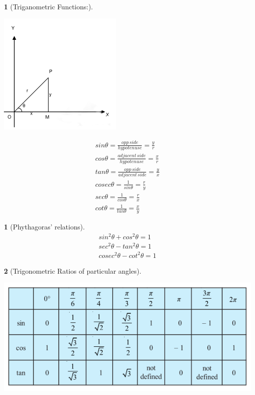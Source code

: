 \documentclass[12pt]{article}
\theoremstyle{colored}
\newtheorem*{defn}{}
\theoremstyle{subcolored}
\newtheorem*{subdefn}{}
\begin{document}
\begin{multicols}{2}
\begin{defn}[Triganometric Functions:]
\end{defn}

\begin{center}
  \includegraphics[scale=0.45]{im7.png}
\end{center}

\begin{align*}
sin \theta=\frac{opp\,side}{hypotenuse}=\frac{y}{r}\\
cos \theta=\frac{adjacent\,side}{hypotenuse}=\frac{x}{r}\\
tan \theta=\frac{opp\,side}{adjacent\,side}=\frac{y}{x}\\
cosec \theta = \frac{1}{sin \theta}=\frac{r}{y}\\
sec \theta = \frac{1}{cos \theta}=\frac{r}{x}\\
cot \theta = \frac{1}{tan \theta} = \frac{x}{y}
\end{align*}




  

\begin{subdefn}[Phythagoras' relations]
  \begin{align*}
    sin^2 \theta + cos^2 \theta =1 \\
    sec^2 \theta - tan^2 \theta = 1 \\
    cosec^2 \theta - cot^2 \theta =1
  \end{align*}
  
\end{subdefn}

\begin{subdefn}[Trigonometric Ratios of particular angles]
  \begin{center}
    \includegraphics[scale=0.45]{im8.png}
  \end{center}
  

\end{subdefn}
\end{multicols}
\end{document}
